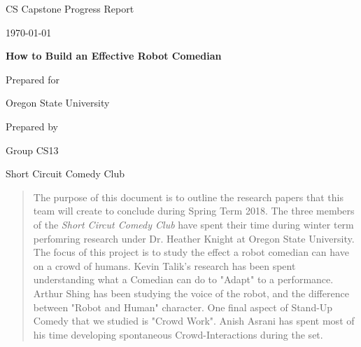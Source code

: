 \documentclass[onecolumn, draftclsnofoot,10pt, compsoc]{IEEEtran}
\def \CapstoneTeamName{	Short Circuit Comedy Club	}
\def \CapstoneTeamNumber{		CS13}
\def \CapstoneProjectName{		How to Build an Effective Robot Comedian}
\def \CapstoneSponsorCompany{	Oregon State University}
\def \DocType{		%
				Progress Report
				}
\begin{document}
\begin{titlepage}
    \begin{singlespace}
        \hfill
        \par\vspace{.2in}
        \centering
        \scshape{
            \huge CS Capstone \DocType \par
            {\large\today}\par
            \vspace{.5in}
            \textbf{\Huge\CapstoneProjectName}\par
            \vfill
            {\large Prepared for}\par
            \Huge \CapstoneSponsorCompany\par
            \vspace{5pt}
            {\large Prepared by }\par
            Group\CapstoneTeamNumber\par
            \CapstoneTeamName\par
            \vspace{5pt}
            \vspace{20pt}
        }
        \begin{abstract}
			The purpose of this document is to outline the research papers that this team will create to conclude during Spring Term 2018.
			The three members of the \textit{Short Circut Comedy Club} have spent their time during winter term perfomring research under Dr. Heather Knight at Oregon State University.
			The focus of this project is to study the effect a robot comedian can have on a crowd of humans.
			Kevin Talik's research has been spent understanding what a Comedian can do to "Adapt" to a performance.
			Arthur Shing has been studying the voice of the robot, and the difference between "Robot and Human" character.
			One final aspect of Stand-Up Comedy that we studied is "Crowd Work". Anish Asrani has spent most of his time developing spontaneous Crowd-Interactions during the set.
        \end{abstract}
    \end{singlespace}
\end{titlepage}
\newpage
{}
\tableofcontents
\clearpage
\end{document}
